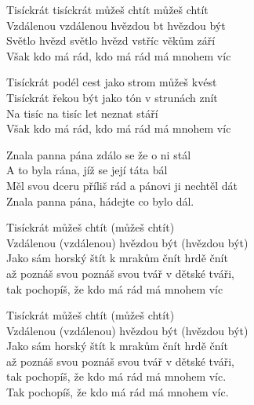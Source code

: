 
\ve
{}Tisíckrát tisíckrát můžeš chtít můžeš chtít\\
Vzdálenou vzdálenou hvězdou bt hvězdou být\\
Světlo hvězd světlo hvězd vstříc věkům září\\
Však kdo má rád, kdo má rád má mnohem víc

\ve
Tisíckrát podél cest jako strom můžeš kvést\\
Tisíckrát řekou být jako tón v strunách znít\\
Na tisíc na tisíc let neznat stáří\\
Však kdo má rád, kdo má rád má mnohem víc


\cho{}
Znala panna pána zdálo se že o ni stál\\
A to byla rána, jíž se její táta bál\\
Měl svou dceru příliš rád a pánovi ji nechtěl dát\\
Znala panna pána, hádejte co bylo dál.

\ve
Tisíckrát můžeš chtít (můžeš chtít)\\
Vzdálenou (vzdálenou) hvězdou být (hvězdou být)\\
Jako sám horský štít k mrakům čnít hrdě čnít \\
až poznáš svou poznáš svou tvář v dětské tváři,\\
tak pochopíš, že kdo má rád má mnohem víc

\cho{}

\ve
Tisíckrát můžeš chtít (můžeš chtít)\\
Vzdálenou (vzdálenou) hvězdou být (hvězdou být)\\
Jako sám horský štít k mrakům čnít hrdě čnít \\
až poznáš svou poznáš svou tvář v dětské tváři,\\
tak pochopíš, že kdo má rád má mnohem víc.\\
Tak pochopíš, že kdo má rád má mnohem víc.

\esong{}